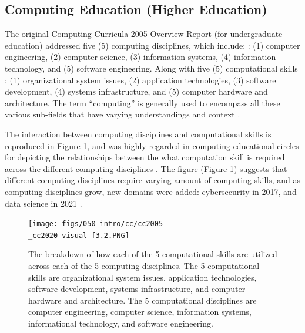 \documentclass[010-intro.tex]{subfiles}
\begin{document}
\subsection{Computing Education (Higher Education)}

    The original Computing Curricula 2005 Overview Report (for undergraduate education)
    addressed five (5) computing disciplines, which include: \cite{cc2005}:
    (1) computer engineering,
    (2) computer science,
    (3) information systems,
    (4) information technology, and
    (5) software engineering.
    Along with five (5) computational skills \cite{cc2005, cc2020}:
    (1) organizational system issues,
    (2) application technologies,
    (3) software development,
    (4) systems infrastructure, and
    (5) computer hardware and architecture.
    The term ``computing'' is generally used to encompass all these various sub-fields that have varying understandings and context
    \cite{cc2005, cc2020}.

    The interaction between computing disciplines and computational skills is reproduced in
    Figure \ref{fig:comp-disciplines-comp-skills},
    and was highly regarded in computing educational circles for
    depicting the relationships between the what computation skill is required across the different
    computing disciplines
    \cite{cc2005, cc2020}.
    The figure (Figure \ref{fig:comp-disciplines-comp-skills})
    suggests that different computing disciplines require varying amount of computing skills,
    and as computing disciplines grow, new domains were added:
    cybersecurity in 2017, and
    data science in 2021
    \cite{ccdsc2021}.

    \begin{figure}[htb]
        \centering
        \texttt{[image: figs/050-intro/cc/cc2005\\\_cc2020-visual-f3.2.PNG]}
        \caption[Computational skills across computing disciplines]{
            The breakdown of how each of the 5 computational skills are utilized across each of the 5 computing disciplines.
            The 5 computational skills are
            organizational system issues, application technologies, software development, systems infrastructure, and computer hardware and architecture.
            The 5 computational disciplines are
            computer engineering, computer science, information systems, informational technology, and software engineering.
        }
        \label{fig:comp-disciplines-comp-skills}
    \end{figure}
\end{document}
